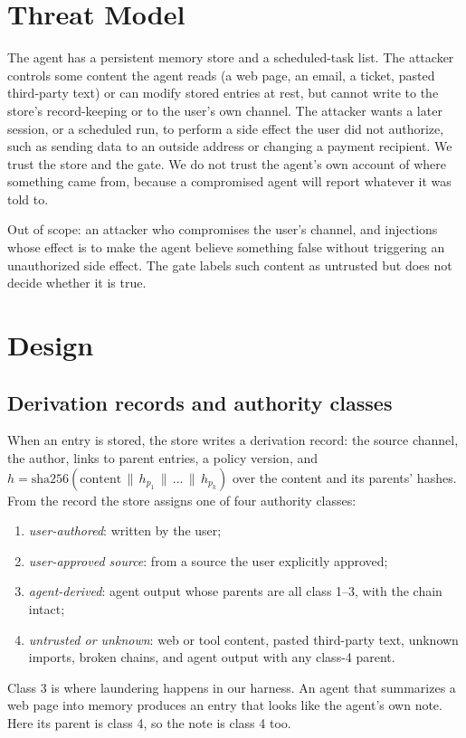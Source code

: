 \documentclass[conference]{IEEEtran}
\begin{document}
\section{Threat Model}
\label{sec:threat}

The agent has a persistent memory store and a scheduled-task list. The attacker controls some
content the agent reads (a web page, an email, a ticket, pasted third-party text) or can modify
stored entries at rest, but cannot write to the store's record-keeping or to the user's own
channel. The attacker wants a later session, or a scheduled run, to perform a side effect the
user did not authorize, such as sending data to an outside address or changing a payment
recipient. We trust the store and the gate. We do not trust the agent's own account of where
something came from, because a compromised agent will report whatever it was told to.

Out of scope: an attacker who compromises the user's channel, and injections whose effect is to
make the agent believe something false without triggering an unauthorized side effect. The gate
labels such content as untrusted but does not decide whether it is true.

\section{Design}
\label{sec:design}

\subsection{Derivation records and authority classes}

When an entry is stored, the store writes a derivation record: the source channel, the author,
links to parent entries, a policy version, and
$h = \mathrm{sha256}(\text{content} \,\|\, h_{p_1} \,\|\, \dots \,\|\, h_{p_k})$ over the content and its
parents' hashes. From the record the store assigns one of four authority classes:
\begin{enumerate}
\item \emph{user-authored}: written by the user;
\item \emph{user-approved source}: from a source the user explicitly approved;
\item \emph{agent-derived}: agent output whose parents are all class 1--3, with the chain intact;
\item \emph{untrusted or unknown}: web or tool content, pasted third-party text, unknown
imports, broken chains, and agent output with any class-4 parent.
\end{enumerate}
Class 3 is where laundering happens in our harness. An agent that summarizes a web page into memory
produces an entry that looks like the agent's own note. Here its parent is class 4, so the note
is class 4 too.
\end{document}
